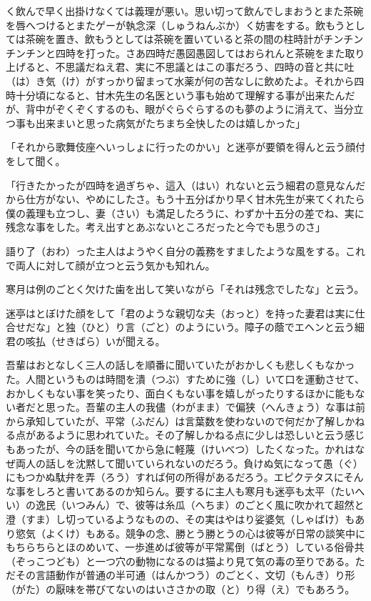 \documentclass{book}
\begin{document}
く飲んで早く出掛けなくては義理が悪い。思い切って飲んでしまおうとまた茶碗を唇へつけるとまたゲーが執念深（しゅうねんぶか）く妨害をする。飲もうとしては茶碗を置き、飲もうとしては茶碗を置いていると茶の間の柱時計がチンチンチンチンと四時を打った。さあ四時だ愚図愚図してはおられんと茶碗をまた取り上げると、不思議だねえ君、実に不思議とはこの事だろう、四時の音と共に吐（は）き気（け）がすっかり留まって水薬が何の苦なしに飲めたよ。それから四時十分頃になると、甘木先生の名医という事も始めて理解する事が出来たんだが、背中がぞくぞくするのも、眼がぐらぐらするのも夢のように消えて、当分立つ事も出来まいと思った病気がたちまち全快したのは嬉しかった」

「それから歌舞伎座へいっしょに行ったのかい」と迷亭が要領を得んと云う顔付をして聞く。

「行きたかったが四時を過ぎちゃ、這入（はい）れないと云う細君の意見なんだから仕方がない、やめにしたさ。もう十五分ばかり早く甘木先生が来てくれたら僕の義理も立つし、妻（さい）も満足したろうに、わずか十五分の差でね、実に残念な事をした。考え出すとあぶないところだったと今でも思うのさ」

語り了（おわ）った主人はようやく自分の義務をすましたような風をする。これで両人に対して顔が立つと云う気かも知れん。

寒月は例のごとく欠けた歯を出して笑いながら「それは残念でしたな」と云う。

迷亭はとぼけた顔をして「君のような親切な夫（おっと）を持った妻君は実に仕合せだな」と独（ひと）り言（ごと）のようにいう。障子の蔭でエヘンと云う細君の咳払（せきばら）いが聞える。

吾輩はおとなしく三人の話しを順番に聞いていたがおかしくも悲しくもなかった。人間というものは時間を潰（つぶ）すために強（し）いて口を運動させて、おかしくもない事を笑ったり、面白くもない事を嬉しがったりするほかに能もない者だと思った。吾輩の主人の我儘（わがまま）で偏狭（へんきょう）な事は前から承知していたが、平常（ふだん）は言葉数を使わないので何だか了解しかねる点があるように思われていた。その了解しかねる点に少しは恐しいと云う感じもあったが、今の話を聞いてから急に軽蔑（けいべつ）したくなった。かれはなぜ両人の話しを沈黙して聞いていられないのだろう。負けぬ気になって愚（ぐ）にもつかぬ駄弁を弄（ろう）すれば何の所得があるだろう。エピクテタスにそんな事をしろと書いてあるのか知らん。要するに主人も寒月も迷亭も太平（たいへい）の逸民（いつみん）で、彼等は糸瓜（へちま）のごとく風に吹かれて超然と澄（すま）し切っているようなものの、その実はやはり娑婆気（しゃばけ）もあり慾気（よくけ）もある。競争の念、勝とう勝とうの心は彼等が日常の談笑中にもちらちらとほのめいて、一歩進めば彼等が平常罵倒（ばとう）している俗骨共（ぞっこつども）と一つ穴の動物になるのは猫より見て気の毒の至りである。ただその言語動作が普通の半可通（はんかつう）のごとく、文切（もんき）り形（がた）の厭味を帯びてないのはいささかの取（と）り得（え）でもあろう。
\end{document}

